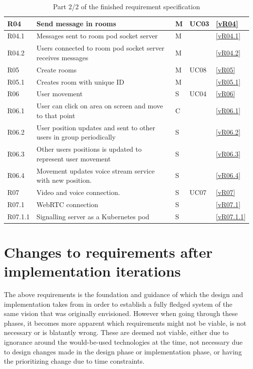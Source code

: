 \begin{table}[htb]
\begin{tabularx}{\textwidth}{|l|X|l|l|l|}
\hline
R04 & Send message in rooms & M & UC03 & \ref{vR04}    \\ \hline
R04.1 & Messages sent to room pod socket server & M & & \ref{vR04.1}    \\ \hline
R04.2 & Users connected to room pod socket server receives messages & M & & \ref{vR04.2}    \\ \hline
R05 & Create rooms & M & UC08 & \ref{vR05}    \\ \hline
R05.1 & Creates room with unique ID & M & & \ref{vR05.1}   \\ \hline
R06 & User movement & S & UC04 & \ref{vR06}    \\ \hline
R06.1 & User can click on area on screen and move to that point & C & & \ref{vR06.1}   \\ \hline
R06.2 & User position updates and sent to other users in group periodically & S & & \ref{vR06.2}    \\ \hline
R06.3 & Other users positions is updated to represent user movement & S & & \ref{vR06.3}     \\ \hline
R06.4 & Movement updates voice stream service with new position. & S & & \ref{vR06.4}    \\ \hline
R07 & Video and voice connection. & S & UC07 & \ref{vR07}     \\ \hline
R07.1 & WebRTC connection & S & & \ref{vR07.1}   \\ \hline
R07.1.1 & Signalling server as a Kubernetes pod & S & & \ref{vR07.1.1}    \\ \hline
\end{tabularx}
\caption{Part 2/2 of the finished requirement specification}
\label{tab:risks}
\end{table}

\newpage
\section{Changes to requirements after implementation iterations}
The above requirements is the foundation and guidance of which the design and implementation takes from in order to establish a fully fledged system of the same vision that was originally envisioned. However when going through these phases, it becomes more apparent which requirements might not be viable, is not necessary or is blatantly wrong. These are deemed not viable, either due to ignorance around the would-be-used technologies at the time, not necessary due to design changes made in the design phase or implementation phase, or having the prioritizing change due to time constraints.

